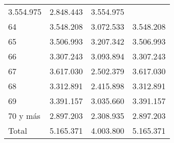 \begin{tabular}{llll}
  \multicolumn{1}{|r}{3.554.975} &
  \multicolumn{1}{r}{2.848.443} &
  \multicolumn{1}{r}{3.554.975} \\
\multicolumn{1}{l}{\hspace{1em}64} &
  \multicolumn{1}{|r}{3.548.208} &
  \multicolumn{1}{r}{3.072.533} &
  \multicolumn{1}{r}{3.548.208} \\
\multicolumn{1}{l}{\hspace{1em}65} &
  \multicolumn{1}{|r}{3.506.993} &
  \multicolumn{1}{r}{3.207.342} &
  \multicolumn{1}{r}{3.506.993} \\
\multicolumn{1}{l}{\hspace{1em}66} &
  \multicolumn{1}{|r}{3.307.243} &
  \multicolumn{1}{r}{3.093.894} &
  \multicolumn{1}{r}{3.307.243} \\
\multicolumn{1}{l}{\hspace{1em}67} &
  \multicolumn{1}{|r}{3.617.030} &
  \multicolumn{1}{r}{2.502.379} &
  \multicolumn{1}{r}{3.617.030} \\
\multicolumn{1}{l}{\hspace{1em}68} &
  \multicolumn{1}{|r}{3.312.891} &
  \multicolumn{1}{r}{2.415.898} &
  \multicolumn{1}{r}{3.312.891} \\
\multicolumn{1}{l}{\hspace{1em}69} &
  \multicolumn{1}{|r}{3.391.157} &
  \multicolumn{1}{r}{3.035.660} &
  \multicolumn{1}{r}{3.391.157} \\
\multicolumn{1}{l}{\hspace{1em}70 y más} &
  \multicolumn{1}{|r}{2.897.203} &
  \multicolumn{1}{r}{2.308.935} &
  \multicolumn{1}{r}{2.897.203} \\
\multicolumn{1}{l}{\hspace{1em}Total} &
  \multicolumn{1}{|r}{5.165.371} &
  \multicolumn{1}{r}{4.003.800} &
  \multicolumn{1}{r}{5.165.371} \\
\cline{1-4}
\end{tabular}
